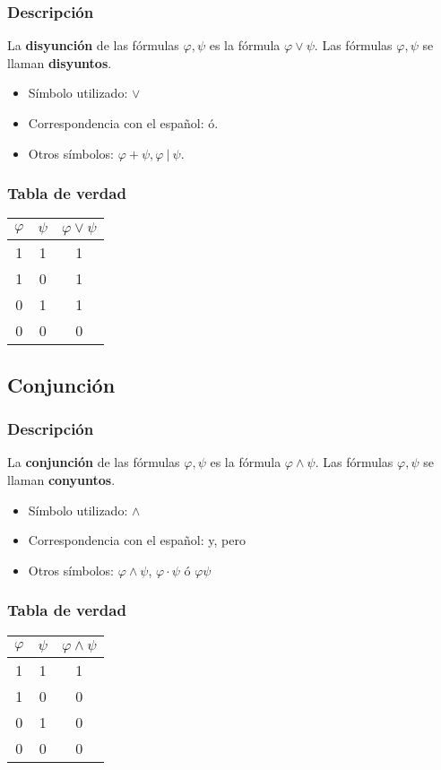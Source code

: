 \documentclass[a4paper]{article}
\begin{document}
\subsubsection{Descripción}
\noindent
La \textbf{disyunción} de las fórmulas $\varphi,\psi$ es la fórmula
$\varphi \lor \psi$. 
\newline
Las fórmulas $\varphi,\psi$ se llaman \textbf{disyuntos}.
\begin{itemize}
    \item Símbolo utilizado:  $\lor$ 
    \item Correspondencia con el español: ó.
    \item Otros símbolos: \(\varphi + \psi, \varphi \ | \ \psi\).
\end{itemize}
\subsubsection{Tabla de verdad}
\begin{center}
    \begin{tabular}{ccc}
    $\varphi$ & \(\psi\) & $\varphi \lor \psi$\\
    \midrule
    1 & 1 & 1 \\
    1 & 0 & 1 \\
    0 & 1 & 1 \\
    0 & 0 & 0 \\
    \end{tabular}
\end{center}
\subsection{Conjunción}
\subsubsection{Descripción}
La \textbf{conjunción} de las fórmulas $\varphi,\psi$ es la fórmula
$\varphi \land \psi$. Las fórmulas $\varphi ,\psi$ se llaman 
\textbf{conyuntos}.
\begin{itemize}
    \item Símbolo utilizado: \(\land\)
    \item Correspondencia con el español: y, pero
    \item Otros símbolos: \(\varphi \land \psi\), \(\varphi \cdot \psi\) ó \(\varphi \psi\)
\end{itemize}
\subsubsection{Tabla de verdad}
\begin{center}
    \begin{tabular}{ccc}
    $\varphi$ & \(\psi\) & $\varphi \land \psi$\\
    \midrule
    1 & 1 & 1 \\
    1 & 0 & 0 \\
    0 & 1 & 0 \\
    0 & 0 & 0 \\
    \end{tabular}
\end{center}
\end{document}
